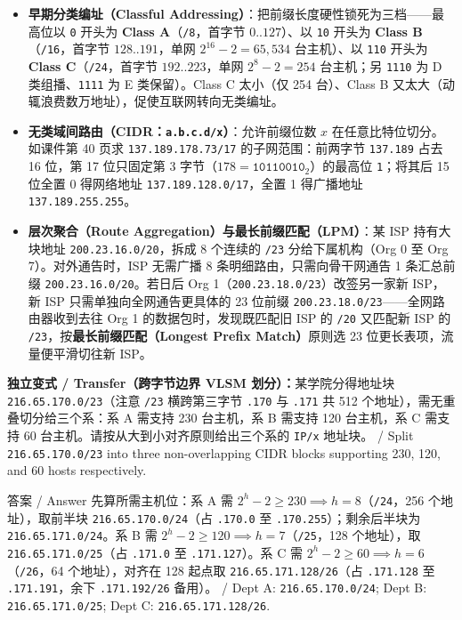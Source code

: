 \begin{itemize}
\item \textbf{早期分类编址（Classful Addressing）}：把前缀长度硬性锁死为三档——最高位以 \texttt{0} 开头为 \textbf{Class A}（\texttt{/8}，首字节 $0..127$）、以 \texttt{10} 开头为 \textbf{Class B}（\texttt{/16}，首字节 $128..191$，单网 $2^{16}-2=65{,}534$ 台主机）、以 \texttt{110} 开头为 \textbf{Class C}（\texttt{/24}，首字节 $192..223$，单网 $2^8-2=254$ 台主机；另 \texttt{1110} 为 D 类组播、\texttt{1111} 为 E 类保留）。Class C 太小（仅 254 台）、Class B 又太大（动辄浪费数万地址），促使互联网转向无类编址。
\item \textbf{无类域间路由（CIDR：\texttt{a.b.c.d/x}）}：允许前缀位数 $x$ 在任意比特位切分。如课件第 40 页求 \texttt{137.189.178.73/17} 的子网范围：前两字节 \texttt{137.189} 占去 16 位，第 17 位只固定第 3 字节（$178 = \mathtt{10110010}_2$）的最高位 \texttt{1}；将其后 15 位全置 0 得网络地址 \texttt{137.189.128.0/17}，全置 1 得广播地址 \texttt{137.189.255.255}。
\item \textbf{层次聚合（Route Aggregation）与最长前缀匹配（LPM）}：某 ISP 持有大块地址 \texttt{200.23.16.0/20}，拆成 8 个连续的 \texttt{/23} 分给下属机构（Org 0 至 Org 7）。对外通告时，ISP 无需广播 8 条明细路由，只需向骨干网通告 1 条汇总前缀 \texttt{200.23.16.0/20}。若日后 Org 1（\texttt{200.23.18.0/23}）改签另一家新 ISP，新 ISP 只需单独向全网通告更具体的 23 位前缀 \texttt{200.23.18.0/23}——全网路由器收到去往 Org 1 的数据包时，发现既匹配旧 ISP 的 \texttt{/20} 又匹配新 ISP 的 \texttt{/23}，按\textbf{最长前缀匹配（Longest Prefix Match）}原则选 23 位更长表项，流量便平滑切往新 ISP。
\end{itemize}

\textbf{独立变式 / Transfer（跨字节边界 VLSM 划分）：}某学院分得地址块 \texttt{216.65.170.0/23}（注意 \texttt{/23} 横跨第三字节 \texttt{.170} 与 \texttt{.171} 共 512 个地址），需无重叠切分给三个系：系 A 需支持 230 台主机，系 B 需支持 120 台主机，系 C 需支持 60 台主机。请按从大到小对齐原则给出三个系的 \texttt{IP/x} 地址块。 / Split \texttt{216.65.170.0/23} into three non-overlapping CIDR blocks supporting 230, 120, and 60 hosts respectively.

\begin{StudySolution}{答案 / Answer}
先算所需主机位：系 A 需 $2^h - 2 \ge 230 \implies h = 8$（\texttt{/24}，256 个地址），取前半块 \texttt{216.65.170.0/24}（占 \texttt{.170.0} 至 \texttt{.170.255}）；剩余后半块为 \texttt{216.65.171.0/24}。系 B 需 $2^h - 2 \ge 120 \implies h = 7$（\texttt{/25}，128 个地址），取 \texttt{216.65.171.0/25}（占 \texttt{.171.0} 至 \texttt{.171.127}）。系 C 需 $2^h - 2 \ge 60 \implies h = 6$（\texttt{/26}，64 个地址），对齐在 128 起点取 \texttt{216.65.171.128/26}（占 \texttt{.171.128} 至 \texttt{.171.191}，余下 \texttt{.171.192/26} 备用）。 / Dept A: \texttt{216.65.170.0/24}; Dept B: \texttt{216.65.171.0/25}; Dept C: \texttt{216.65.171.128/26}.
\end{StudySolution}



